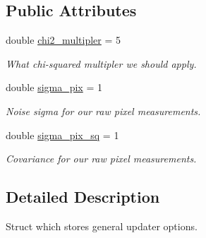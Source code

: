 \subsection*{Public Attributes}
\begin{DoxyCompactItemize}
\item 
\mbox{\label{structov__msckf_1_1UpdaterOptions_a2358d5ab780a81a3486e7036ed38e2ec}} 
double \hyperlink{structov__msckf_1_1UpdaterOptions_a2358d5ab780a81a3486e7036ed38e2ec}{chi2\+\_\+multipler} = 5
\begin{DoxyCompactList}\small\item\em What chi-\/squared multipler we should apply. \end{DoxyCompactList}\item 
\mbox{\label{structov__msckf_1_1UpdaterOptions_ab8e76b7991330d0c4632698b44ba4bbc}} 
double \hyperlink{structov__msckf_1_1UpdaterOptions_ab8e76b7991330d0c4632698b44ba4bbc}{sigma\+\_\+pix} = 1
\begin{DoxyCompactList}\small\item\em Noise sigma for our raw pixel measurements. \end{DoxyCompactList}\item 
\mbox{\label{structov__msckf_1_1UpdaterOptions_a690671f9525d34e7058872f4f852fdad}} 
double \hyperlink{structov__msckf_1_1UpdaterOptions_a690671f9525d34e7058872f4f852fdad}{sigma\+\_\+pix\+\_\+sq} = 1
\begin{DoxyCompactList}\small\item\em Covariance for our raw pixel measurements. \end{DoxyCompactList}\end{DoxyCompactItemize}


\subsection{Detailed Description}
Struct which stores general updater options. 